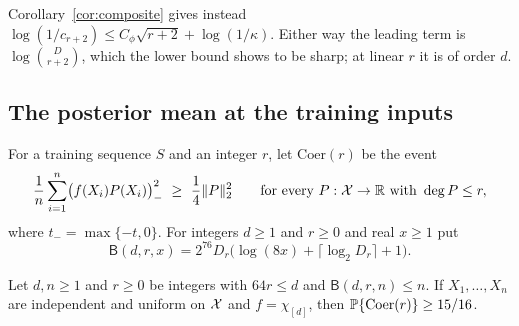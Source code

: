 Corollary~\ref{cor:composite} gives instead
$\log(1/c_{r+2})\le C_\phi\sqrt{r+2}+\log(1/\kappa)$. Either way the
leading term is $\log\binom D{r+2}$, which the lower bound shows to be
sharp; at linear $r$ it is of order $d$.

\subsection{The posterior mean at the training inputs}\label{sec:mean-train}
For a training sequence $S$ and an integer $r$, let $\mathrm{Coer}(r)$ be
the event
\[
 \frac1n\sum_{i=1}^n\bigl(f(X_i)P(X_i)\bigr)_-^2\ \ge\ \frac14\|P\|_2^2
 \qquad\text{for every }P:\X\to\R\text{ with }\deg P\le r,
\]
where $t_-=\max\{-t,0\}$. For integers $d\ge1$ and $r\ge0$ and real
$x\ge1$ put
\begin{equation}\label{eq:leanbudget}
 \mathsf B(d,r,x)=2^{76}D_r\bigl(\log(8x)+\lceil\log_2D_r\rceil+1\bigr).
\end{equation}

\begin{theorem}\label{thm:leancoer}
Let $d,n\ge1$ and $r\ge0$ be integers with $64r\le d$ and
$\mathsf B(d,r,n)\le n$. If $X_1,\ldots,X_n$ are independent and uniform
on $\mathcal X$ and $f=\chi_{[d]}$, then $\mathbb P\{\mathrm{Coer}(r)\}\ge15/16$.
\end{theorem}

